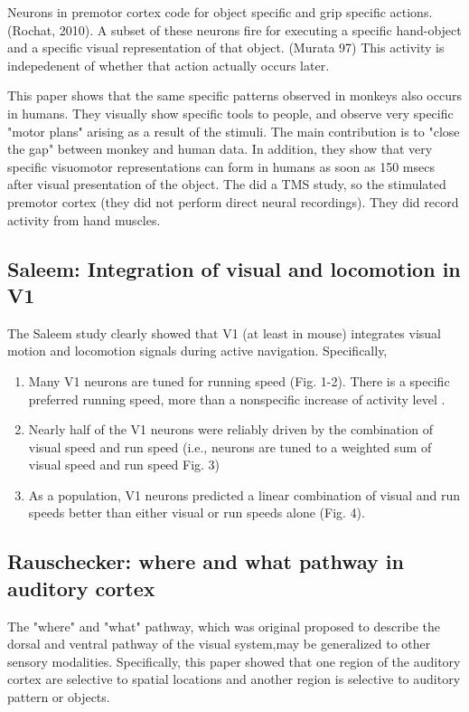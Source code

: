 \documentclass{article} %
\begin{document}
Neurons in premotor cortex code for object specific and grip specific actions.
(Rochat, 2010). A subset of these neurons fire for executing a specific
hand-object and a specific visual representation of that object. (Murata 97)
This activity is indepedenent of whether that action actually occurs later.

This paper shows that the same specific patterns observed in monkeys also occurs
in humans.  They visually show specific tools to people, and observe very
specific "motor plans" arising as a result of the stimuli. The main contribution
is to "close the gap" between monkey and human data. In addition, they show that
very specific visuomotor representations can form in humans as soon as 150 msecs
after visual presentation of the object.  The did a TMS study, so the stimulated
premotor cortex (they did not perform direct neural recordings).  They did
record activity from hand muscles.

\subsection{Saleem: Integration of visual and locomotion in V1}

The Saleem study \cite{Saleem2013} clearly showed that V1 (at least in mouse) 
integrates visual motion and locomotion signals during active navigation. Specifically,

\begin{enumerate}
\item Many V1 neurons are tuned for running speed (Fig. 1-2). There is a specific preferred 
running speed, more than a nonspecific increase of activity level \cite{Niell2010}.
\item Nearly half of the V1 neurons were reliably driven by the combination of visual speed and 
run speed (i.e., neurons are tuned to a weighted sum of visual speed and run speed Fig. 3)
\item As a population, V1 neurons predicted a linear combination of visual and run 
speeds better than either visual or run speeds alone (Fig. 4).
\end{enumerate}

\subsection{Rauschecker: where and what pathway in auditory cortex}

The "where" and "what" pathway, which was original proposed to describe the 
dorsal and ventral pathway of the visual system,may be generalized to other sensory 
modalities. Specifically, this paper \cite{Rauschecker2000} 
showed that one region of the auditory cortex are selective to spatial locations and 
another region is selective to auditory pattern or objects. 
\end{document}
